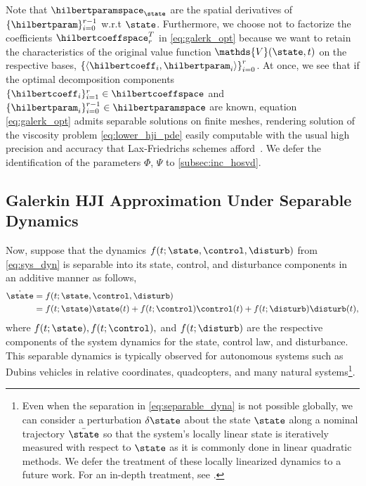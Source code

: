 %
Note that $\hilbertparamspace_{\state}$ are the spatial derivatives of $\{\hilbertparam\}_{i=0}^{r-1}$ w.r.t $\state$. Furthermore, we choose not to factorize the coefficients $\hilbertcoeffspace_r^T$ in \eqref{eq:galerk_opt} because we want to retain the characteristics of the original value function $\mathds{V}(\state, t)$ on the respective bases, $\left\{\langle\hilbertcoeff_i, \hilbertparam_i\rangle\right\}_{i=0}^{r}$. At once, we see that if the optimal decomposition components $\{\hilbertcoeff_i\}_{i=1}^r \in \hilbertcoeffspace$ and $\{\hilbertparam_i\}_{i=0}^{r-1} \in \hilbertparamspace$ are known, equation \eqref{eq:galerk_opt} admits separable solutions  on finite meshes, rendering solution of the viscosity problem \eqref{eq:lower_hji_pde} easily computable  with the usual high precision and accuracy that Lax-Friedrichs schemes afford~\cite{CrandallLaxFriedrichs, CrandallFractional, Crandall1984, OsherShuENO}. We defer the identification of the parameters $\Phi$, $\Psi$ to \autoref{subsec:inc_hosvd}.

\subsection{Galerkin HJI Approximation Under Separable Dynamics}

Now, suppose that the dynamics $f(t; \state, \control, \disturb)$ from \eqref{eq:sys_dyn} is separable into its state, control, and disturbance components in an additive manner as follows,
%
\begin{align}
	\dot{\state} &= f(t; \state, \control, \disturb) \\
				 &= f(t; {\state}) \state(t) + f(t; \control) \control(t) + f(t; \disturb) \disturb(t),
	\label{eq:separable_dyna}
\end{align}
%
where $f (t; \state), f(t; \control),$ and $f(t; \disturb)$ are the respective components of the system dynamics for the state, control law, and disturbance. This separable dynamics is typically observed for autonomous systems such as Dubins vehicles in relative coordinates, quadcopters, and many natural systems\footnote{Even when the separation in \eqref{eq:separable_dyna} is not possible globally, we can consider a perturbation $\delta \state$ about the state $\state$ along a nominal trajectory $\bar{\state}$ so that the system's locally linear state is iteratively measured with respect to $\state$ as it is commonly done in linear quadratic methods. We defer the treatment of these locally linearized dynamics to a future work. For an in-depth treatment, see \cite{DenhamDDP, Mitter1966, McReynolds1967, Jacobson1968new}.}.

